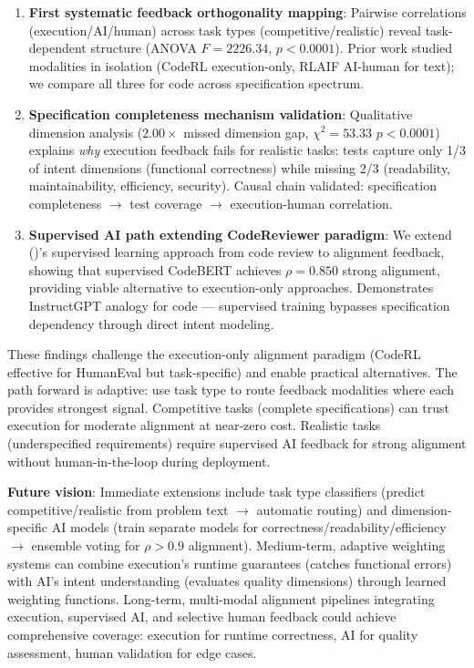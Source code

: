 \begin{enumerate}
\item \textbf{First systematic feedback orthogonality mapping}: Pairwise correlations (execution/AI/human) across task types (competitive/realistic) reveal task-dependent structure (ANOVA $F=2226.34$, $p<0.0001$). Prior work studied modalities in isolation (CodeRL execution-only, RLAIF AI-human for text); we compare all three for code across specification spectrum.

\item \textbf{Specification completeness mechanism validation}: Qualitative dimension analysis ($2.00\times$ missed dimension gap, $\chi^2=53.33$ $p<0.0001$) explains \emph{why} execution feedback fails for realistic tasks: tests capture only 1/3 of intent dimensions (functional correctness) while missing 2/3 (readability, maintainability, efficiency, security). Causal chain validated: specification completeness $\rightarrow$ test coverage $\rightarrow$ execution-human correlation.

\item \textbf{Supervised AI path extending CodeReviewer paradigm}: We extend \citeauthor{li2022codereview} (\citeyear{li2022codereview})'s supervised learning approach from code review to alignment feedback, showing that supervised CodeBERT achieves $\rho=0.850$ strong alignment, providing viable alternative to execution-only approaches. Demonstrates InstructGPT analogy for code --- supervised training bypasses specification dependency through direct intent modeling.
\end{enumerate}

These findings challenge the execution-only alignment paradigm (CodeRL effective for HumanEval but task-specific) and enable practical alternatives. The path forward is adaptive: use task type to route feedback modalities where each provides strongest signal. Competitive tasks (complete specifications) can trust execution for moderate alignment at near-zero cost. Realistic tasks (underspecified requirements) require supervised AI feedback for strong alignment without human-in-the-loop during deployment.

\textbf{Future vision}: Immediate extensions include task type classifiers (predict competitive/realistic from problem text $\rightarrow$ automatic routing) and dimension-specific AI models (train separate models for correctness/readability/efficiency $\rightarrow$ ensemble voting for $\rho>0.9$ alignment). Medium-term, adaptive weighting systems can combine execution's runtime guarantees (catches functional errors) with AI's intent understanding (evaluates quality dimensions) through learned weighting functions. Long-term, multi-modal alignment pipelines integrating execution, supervised AI, and selective human feedback could achieve comprehensive coverage: execution for runtime correctness, AI for quality assessment, human validation for edge cases.

